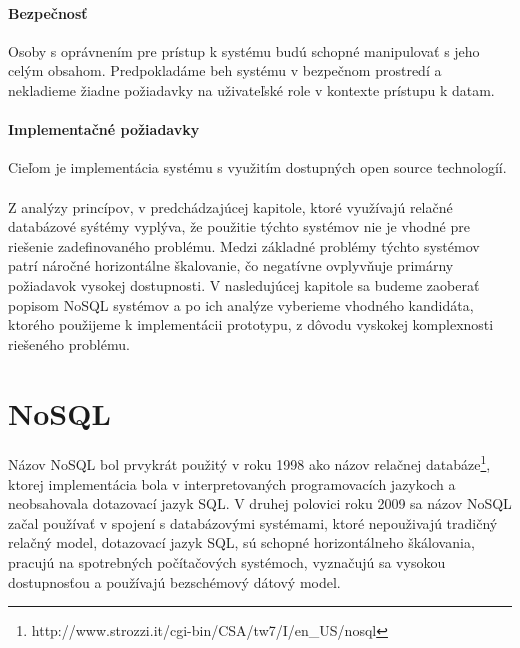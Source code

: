 \documentclass[11pt,twoside,a4paper]{book}
\begin{document}
\subsubsection*{Bezpečnosť}
Osoby s oprávnením pre prístup k systému budú schopné manipulovať s jeho celým obsahom. Predpokladáme beh systému v bezpečnom prostredí a nekladieme žiadne požiadavky na uživateľské role v kontexte prístupu k datam.

\subsubsection*{Implementačné požiadavky}
Cieľom je implementácia systému s využitím dostupných open source technologíí. 

\subsubsection*{}
Z analýzy princípov, v predchádzajúcej kapitole, ktoré využívajú relačné databázové syśtémy vyplýva, že použitie týchto systémov nie je vhodné pre riešenie zadefinovaného problému. Medzi základné problémy týchto systémov patrí náročné horizontálne škalovanie, čo negatívne ovplyvňuje primárny požiadavok vysokej dostupnosti. V nasledujúcej kapitole sa budeme zaoberať popisom NoSQL systémov a po ich analýze vyberieme vhodného kandidáta, ktorého použijeme k implementácii prototypu, z dôvodu vyskokej komplexnosti riešeného problému.





\chapter{NoSQL}
\label{chapter:NoSQL}
Názov NoSQL bol prvykrát použitý v roku 1998 ako názov relačnej databáze\footnote{http://www.strozzi.it/cgi-bin/CSA/tw7/I/en\_US/nosql}, ktorej implementácia bola v interpretovaných programovacích jazykoch a neobsahovala dotazovací jazyk SQL. V druhej polovici roku 2009 sa názov NoSQL začal používať v spojení s databázovými systémami, ktoré nepouživajú tradičný relačný model, dotazovací jazyk SQL, sú schopné horizontálneho škálovania, pracujú na spotrebných počítačových systémoch, vyznačujú sa vysokou dostupnosťou a používajú bezschémový dátový model.
\end{document}
